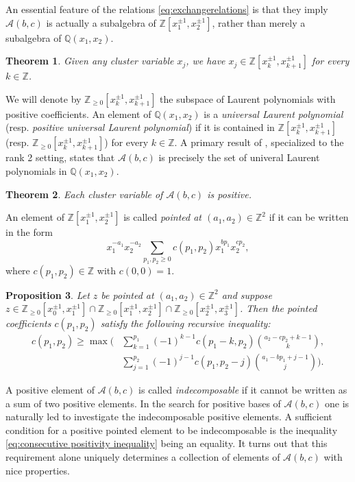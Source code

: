 \documentclass[11pt]{amsart}
\newtheorem{theorem}{Theorem}[section]
\newtheorem{prop}[theorem]{Proposition}
\theoremstyle{remark}
\numberwithin{equation}{section}
\newcommand{\QQ}{\mathbb{Q}}
\newcommand{\ZZ}{\mathbb{Z}}
\newcommand{\cA}{\mathcal{A}}
\begin{document}
An essential feature of the relations \eqref{eq:exchangerelations} is that they imply $\cA(b,c)$ is actually a subalgebra of $\ZZ[x_1^{\pm1},x_2^{\pm1}]$, rather than merely a subalgebra of $\QQ(x_1,x_2)$.
\begin{theorem}\label{th:Laurent}
\cite[Theorem~3.1]{FZ} Given any cluster variable $x_j$, we have $x_j\in\ZZ[x_k^{\pm1},x_{k+1}^{\pm1}]$ for every $k \in \ZZ$.
\end{theorem}

We will denote by $\ZZ_{\ge0}[x_k^{\pm1},x_{k+1}^{\pm1}]$ the subspace of Laurent polynomials with positive coefficients.  An element of $\QQ(x_1,x_2)$ is a \emph{universal Laurent polynomial} (resp.  \emph{positive universal Laurent polynomial}) if it is contained in 
 $\ZZ[x_k^{\pm1},x_{k+1}^{\pm1}]$ (resp. $\ZZ_{\ge0}[x_k^{\pm1},x_{k+1}^{\pm1}]$) for every $k \in \ZZ$.  A primary result of \cite{BFZ}, specialized to the rank 2 setting, states that $\cA(b,c)$ is precisely the set of univeral Laurent polynomials in $\QQ(x_1,x_2)$.

\begin{theorem}
\cite{LS,Rup} Each cluster variable of $\cA(b,c)$ is positive.
\end{theorem}

An element of $\ZZ[x_1^{\pm1},x_2^{\pm1}]$ is called \emph{pointed at
$(a_1,a_2)\in\ZZ^2$} if it can be written in the form
\[
  x_1^{-a_1}x_2^{-a_2}\sum\limits_{p_1,p_2\ge0}c(p_1,p_2)x_1^{bp_1}x_2^{cp_2},
\]
where $c(p_1,p_2)\in\ZZ$ with $c(0,0)=1$.   
\begin{prop}\cite[Proposition~1.5]{LLZ}
  Let $z$ be pointed at $(a_1,a_2)\in\ZZ^2$ and suppose
  $z\in\ZZ_{\ge0}[x_0^{\pm1},x_1^{\pm1}]
  \cap\ZZ_{\ge0}[x_1^{\pm1},x_2^{\pm1}]
  \cap\ZZ_{\ge0}[x_2^{\pm1},x_3^{\pm1}]$.
  Then the pointed coefficients $c(p_1,p_2)$ satisfy the following recursive
  inequality:
  \begin{align}
    \label{eq:consecutive positivity inequality}
    c(p_1,p_2)\ge\max\bigg(
    &\sum\limits_{k=1}^{p_1} (-1)^{k-1}c(p_1-k,p_2){a_2-cp_2+k-1\choose k},\\
    \nonumber&\sum\limits_{ j =1}^{p_2} (-1)^{ j -1}c(p_1,p_2- j ){a_1-bp_1+ j -1\choose  j }\bigg).
  \end{align}
\end{prop}
A positive element of $\cA(b,c)$ is called \emph{indecomposable} if it cannot
be written as a sum of two positive elements.  In the search for positive bases
of $\cA(b,c)$ one is naturally led to investigate the indecomposable positive
elements.  A sufficient condition for a positive pointed element to be
indecomposable is the inequality \eqref{eq:consecutive positivity inequality}
being an equality.  It turns out that this requirement alone uniquely determines
a collection of elements of $\cA(b,c)$ with nice properties.
\end{document}
